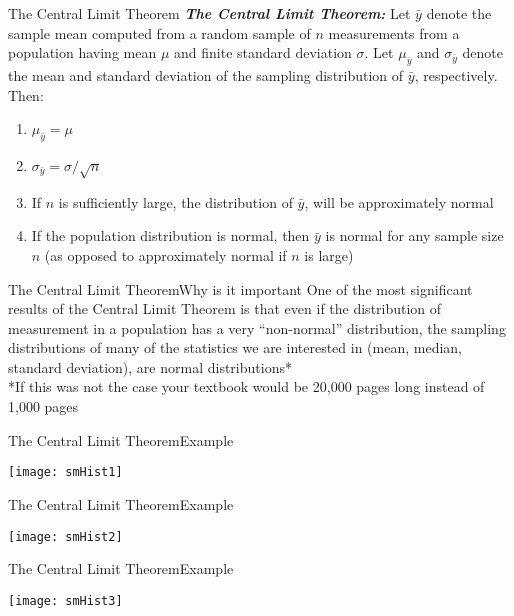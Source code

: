\documentclass[xcolor=dvipsnames]{beamer}
\begin{document}
\begin{frame}{The Central Limit Theorem}
	\textbf{\emph{The Central Limit Theorem:}} Let $\bar{y}$ denote the sample mean computed from a random sample of $n$ measurements from a population having mean $\mu$ and finite standard deviation $\sigma$. Let $\mu_{\bar{y}}$ and $\sigma_{\bar{y}}$ denote the mean and standard deviation of the sampling distribution of $\bar{y}$, respectively. Then:
	\begin{enumerate}
		\item $\mu_{\bar{y}} = \mu$
		\item $\sigma_{\bar{y}} = \sigma / \sqrt{n}$
		\item If $n$ is sufficiently large, the distribution of $\bar{y}$, will be approximately normal
		\item If the population distribution is normal, then $\bar{y}$ is normal for any sample size $n$ (as opposed to approximately normal if $n$ is large)
	\end{enumerate}
\end{frame}

\begin{frame}{The Central Limit Theorem}{Why is it important}
	One of the most significant results of the Central Limit Theorem is that even if the distribution of measurement in a population has a very ``non-normal'' distribution, the sampling distributions of many of the statistics we are interested in (mean, median, standard deviation), are normal distributions* \\
	
	\vspace*{20 pt}
	*If this was not the case your textbook would be 20,000 pages long instead of 1,000 pages
\end{frame}

\begin{frame}{The Central Limit Theorem}{Example}
	\begin{center}
		\texttt{[image: smHist1]}
	\end{center}
\end{frame}

\begin{frame}{The Central Limit Theorem}{Example}
	\begin{center}
		\texttt{[image: smHist2]}
	\end{center}
\end{frame}

\begin{frame}{The Central Limit Theorem}{Example}
	\begin{center}
		\texttt{[image: smHist3]}
	\end{center}
\end{frame}
\end{document}
